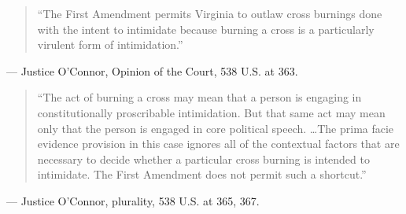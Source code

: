 \documentclass[12pt]{article}
\begin{document}
\begin{quote}
``The First Amendment permits Virginia to outlaw cross burnings done with the intent to intimidate because burning a cross is a particularly virulent form of intimidation.''
\end{quote}
\noindent --- Justice O'Connor, Opinion of the Court, 538 U.S. at 363.

\begin{quote}
``The act of burning a cross may mean that a person is engaging in constitutionally proscribable intimidation. But that same act may mean only that the person is engaged in core political speech. \dots The prima facie evidence provision in this case ignores all of the contextual factors that are necessary to decide whether a particular cross burning is intended to intimidate. The First Amendment does not permit such a shortcut.''
\end{quote}
\noindent --- Justice O'Connor, plurality, 538 U.S. at 365, 367.
\end{document}
